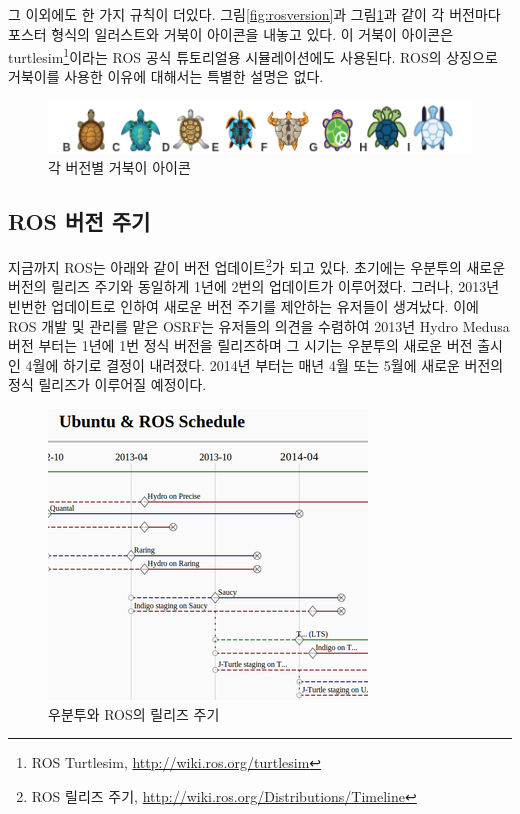 그 이외에도 한 가지 규칙이 더있다. 그림\ref{fig:rosversion}과 그림\ref{fig:ros_turtle_icon}과 같이 각 버전마다 포스터 형식의 일러스트와 거북이 아이콘을 내놓고 있다. 이 거북이 아이콘은 turtlesim\footnote{ROS Turtlesim, \url{http://wiki.ros.org/turtlesim}}이라는 ROS 공식 튜토리얼용 시뮬레이션에도 사용된다. ROS의 상징으로 거북이를 사용한 이유에 대해서는 특별한 설명은 없다.

\begin{figure}[h]
\centering\includegraphics[width=\columnwidth]{pictures/chapter1/ros_turtle_icon.png}
\caption{각 버전별 거북이 아이콘}
\label{fig:ros_turtle_icon}
\end{figure}

\subsection{ROS 버전 주기}

지금까지 ROS는 아래와 같이 버전 업데이트\footnote{ROS 릴리즈 주기, \url{http://wiki.ros.org/Distributions/Timeline}}가 되고 있다. 초기에는 우분투의 새로운 버전의 릴리즈 주기와 동일하게 1년에 2번의 업데이트가 이루어졌다. 그러나, 2013년 빈번한 업데이트로 인하여 새로운 버전 주기를 제안하는 유저들이 생겨났다. 이에 ROS 개발 및 관리를 맡은 OSRF는 유저들의 의견을 수렴하여 2013년 Hydro Medusa 버전 부터는 1년에 1번 정식 버전을 릴리즈하며 그 시기는 우분투의 새로운 버전 출시인 4월에 하기로 결정이 내려졌다. 2014년 부터는 매년 4월 또는 5월에 새로운 버전의 정식 릴리즈가 이루어질 예정이다.

\begin{figure}[h]
\centering\includegraphics[width=0.5\columnwidth]{pictures/chapter1/ros_timeline.png}
\caption{우분투와 ROS의 릴리즈 주기}
\end{figure}

